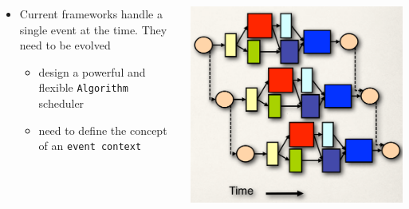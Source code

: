 \documentclass[9pt]{beamer}
\begin{document}
{\begin{columns}
\begin{column}{0.7\textwidth}
\begin{block}{}
\begin{itemize}
            \item Current frameworks handle a single event at the
              time. They need to be evolved
              \begin{itemize}
                \item design a powerful and flexible
                  \texttt{Algorithm} scheduler
                \item need to define the concept of an \texttt{event context}
              \end{itemize}
        \end{itemize}
      \end{block}
    \end{column}
    \begin{column}{0.3\textwidth}
      \includegraphics[width=1\textwidth]{figs/gaudi-hive-2.png}
    \end{column}
  \end{columns}

}
\end{document}
